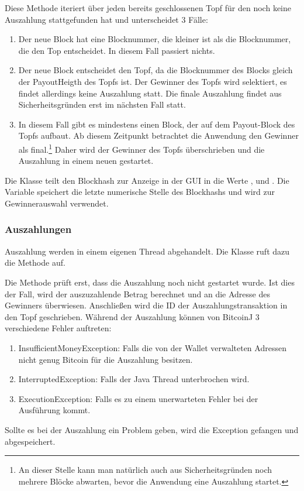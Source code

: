 Diese Methode iteriert über jeden bereits geschlossenen Topf für den noch keine Auszahlung stattgefunden hat und unterscheidet 3 Fälle:
\begin{enumerate}
\item Der neue Block hat eine Blocknummer, die kleiner ist als die Blocknummer, die den Top entscheidet. In diesem Fall passiert nichts.
\item Der neue Block entscheidet den Topf, da die Blocknummer des Blocks gleich der PayoutHeigth des Topfs ist. Der Gewinner des Topfs wird selektiert, es findet allerdings keine Auszahlung statt. Die finale Auszahlung findet aus Sicherheitsgründen erst im nächsten Fall statt.
\item In diesem Fall gibt es mindestens einen Block, der auf dem Payout-Block des Topfs aufbaut. Ab diesem Zeitpunkt betrachtet die Anwendung den Gewinner als final.\footnote{An dieser Stelle kann man natürlich auch aus Sicherheitsgründen noch mehrere Blöcke abwarten, bevor die Anwendung eine Auszahlung startet.} Daher wird der Gewinner des Topfs überschrieben und die Auszahlung in einem neuen  gestartet.
\end{enumerate}

Die Klasse  teilt den Blockhash zur Anzeige in der GUI in die Werte ,  und . Die Variable  speichert die letzte numerische Stelle des Blockhashs und wird zur Gewinnerauswahl verwendet.







\subsubsection{Auszahlungen}
Auszahlung werden in einem eigenen Thread abgehandelt. Die Klasse  ruft dazu die  Methode auf.

Die Methode prüft erst, dass die Auszahlung noch nicht gestartet wurde. Ist dies der Fall, wird der auszuzahlende Betrag berechnet und an die Adresse des Gewinners überwiesen. Anschließen wird die ID der Auszahlungstransaktion in den Topf geschrieben. Während der Auszahlung können von BitcoinJ 3 verschiedene Fehler auftreten:
\begin{enumerate}
\item InsufficientMoneyException: Falls die von der Wallet verwalteten Adressen nicht genug Bitcoin für die Auszahlung besitzen.
\item InterruptedException: Falls der Java Thread unterbrochen wird.
\item ExecutionException: Falls es zu einem unerwarteten Fehler bei der Ausführung kommt.
\end{enumerate}
Sollte es bei der Auszahlung ein Problem geben, wird die Exception gefangen und abgespeichert.

